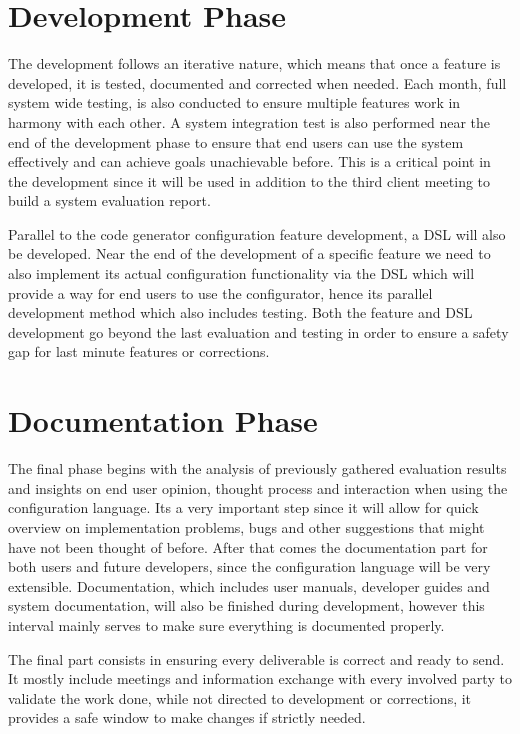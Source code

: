 \section{Development Phase}
\label{sec:dev_plan_dev}

The development follows an iterative nature, which means that once a feature is developed, it is tested, documented and corrected when needed. Each month, full system wide testing, is also conducted to ensure multiple features work in harmony with each other. A system integration test is also performed near the end of the development phase to ensure that end users can use the system effectively and can achieve goals unachievable before. This is a critical point in the development since it will be used in addition to the third client meeting to build a system evaluation report.

Parallel to the code generator configuration feature development, a \gls{DSL} will also be developed. Near the end of the development of a specific feature we need to also implement its actual configuration functionality via the \gls{DSL} which will provide a way for end users to use the configurator, hence its parallel development method which also includes testing. Both the feature and \gls{DSL} development go beyond the last evaluation and testing in order to ensure a safety gap for last minute features or corrections.

\section{Documentation Phase}
\label{sec:dev_plan_doc}

The final phase begins with the analysis of previously gathered evaluation results and insights on end user opinion, thought process and interaction when using the configuration language. Its a very important step since it will allow for quick overview on implementation problems, bugs and other suggestions that might have not been thought of before. After that comes the documentation part for both users and future developers, since the configuration language will be very extensible. Documentation, which includes user manuals, developer guides and system documentation, will also be finished during development, however this interval mainly serves to make sure everything is documented properly.

The final part consists in ensuring every deliverable is correct and ready to send. It mostly include meetings and information exchange with every involved party to validate the work done, while not directed to development or corrections, it provides a safe window to make changes if strictly needed.

